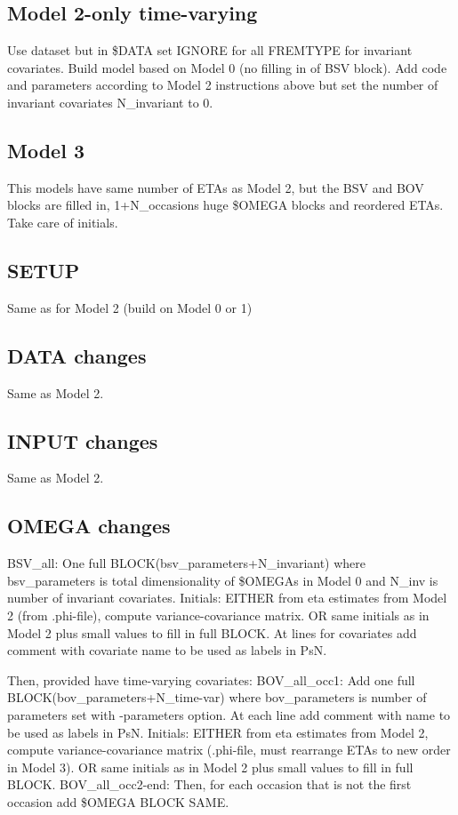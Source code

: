\subsection{Model 2-only time-varying}
Use dataset but in \$DATA set IGNORE for all FREMTYPE for invariant covariates. Build model based on Model 0 (no filling in of BSV block). Add code and parameters according to Model 2 instructions above but set the number of invariant covariates N\_invariant to 0.

\subsection{Model 3}

This models have same number of ETAs as Model 2, but the BSV and BOV blocks are filled in, 1+N\_occasions huge \$OMEGA blocks and reordered ETAs. Take care of initials.

\subsection{SETUP}
Same as for Model 2 (build on Model 0 or 1)

\subsection{DATA changes}
Same as Model 2.
\subsection{INPUT changes}
Same as Model 2.

\subsection{OMEGA changes}
BSV\_all: One full BLOCK(bsv\_parameters+N\_invariant) where bsv\_parameters is total dimensionality of \$OMEGAs in Model 0 and N\_inv is number of invariant covariates.
Initials: EITHER from eta estimates from Model 2 (from .phi-file), compute variance-covariance matrix. OR same initials as in Model 2 plus small values to fill in full BLOCK.
At lines for covariates add comment with covariate name to be used as labels in PsN.

Then, provided have time-varying covariates:
BOV\_all\_occ1: Add one full BLOCK(bov\_parameters+N\_time-var) where bov\_parameters is number of parameters set with -parameters option.
At each line add comment with name to be used as labels in PsN.
Initials: EITHER from eta estimates from Model 2, compute variance-covariance matrix (.phi-file, must rearrange ETAs to new order in Model 3). OR same initials as in Model 2 plus small values to fill in full BLOCK.
BOV\_all\_occ2-end: Then, for each occasion that is not the first occasion add \$OMEGA BLOCK SAME.

